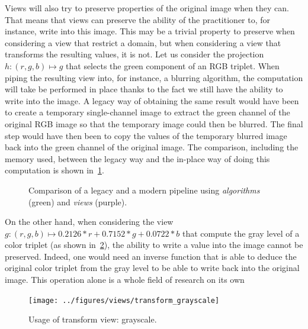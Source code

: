 Views will also try to preserve properties of the original image when they can. That means that views can preserve the
ability of the practitioner to, for instance, write into this image. This may be a trivial property to preserve when
considering a view that restrict a domain, but when considering a view that transforms the resulting values, it is not.
Let us consider the projection \(h: (r,g,b) \mapsto g\) that selects the green component of an RGB triplet. When piping
the resulting view into, for instance, a blurring algorithm, the computation will take be performed in place thanks to
the fact we still have the ability to write into the image. A legacy way of obtaining the same result would have been to
create a temporary single-channel image to extract the green channel of the original RGB image so that the temporary
image could then be blurred. The final step would have then been to copy the values of the temporary blurred image back
into the green channel of the original image. The comparison, including the memory used, between the legacy way and the
in-place way of doing this computation is shown in~\cref{fig.legacy.vs.view}.

\begin{figure}[htbp]
  \centering
  \hfil

  \caption{Comparison of a legacy and a modern pipeline using \emph{algorithms} (green) and \emph{views} (purple).}
  \label{fig.legacy.vs.view}
\end{figure}

On the other hand, when considering the view \(g: (r,g,b) \mapsto 0.2126*r+0.7152*g+0.0722*b\) that compute the gray
level of a color triplet (as shown in~\cref{fig.view.grayscale}), the ability to write a value into the image cannot be
preserved. Indeed, one would need an inverse function that is able to deduce the original color triplet from the gray
level to be able to write back into the original image. This operation alone is a whole field of research on its
own~\parencite{zhang.2016.colorful,levin.2004.colorization,welsh.2002.transferring}

\begin{figure}[htbp]
  \centering
  \texttt{[image: ../figures/views/transform\_grayscale]}
  \caption{Usage of transform view: grayscale.}
  \label{fig.view.grayscale}
\end{figure}

